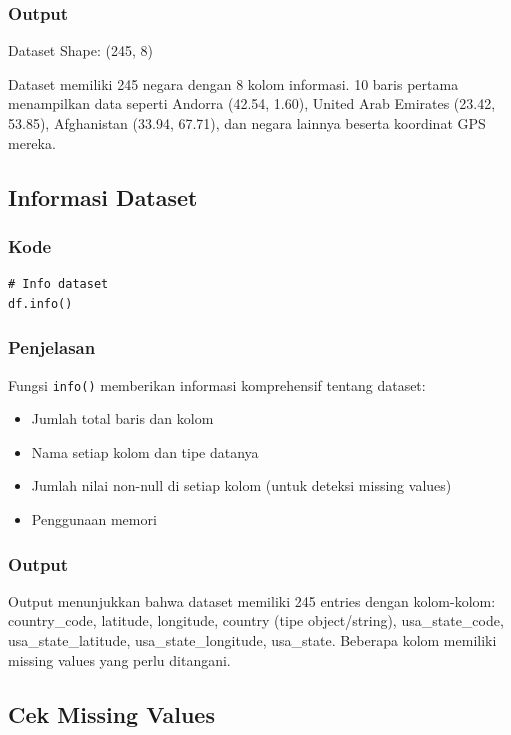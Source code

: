\documentclass[12pt,a4paper]{article}
\begin{document}
\subsubsection{Output}
Dataset Shape: (245, 8)

Dataset memiliki 245 negara dengan 8 kolom informasi. 10 baris pertama menampilkan data seperti Andorra (42.54, 1.60), United Arab Emirates (23.42, 53.85), Afghanistan (33.94, 67.71), dan negara lainnya beserta koordinat GPS mereka.

\subsection{Informasi Dataset}

\subsubsection{Kode}
\begin{lstlisting}[style=pythonstyle]
# Info dataset
df.info()
\end{lstlisting}

\subsubsection{Penjelasan}
Fungsi \texttt{info()} memberikan informasi komprehensif tentang dataset:
\begin{itemize}
    \item Jumlah total baris dan kolom
    \item Nama setiap kolom dan tipe datanya
    \item Jumlah nilai non-null di setiap kolom (untuk deteksi missing values)
    \item Penggunaan memori
\end{itemize}

\subsubsection{Output}
Output menunjukkan bahwa dataset memiliki 245 entries dengan kolom-kolom: country\_code, latitude, longitude, country (tipe object/string), usa\_state\_code, usa\_state\_latitude, usa\_state\_longitude, usa\_state. Beberapa kolom memiliki missing values yang perlu ditangani.

\subsection{Cek Missing Values}
\end{document}
